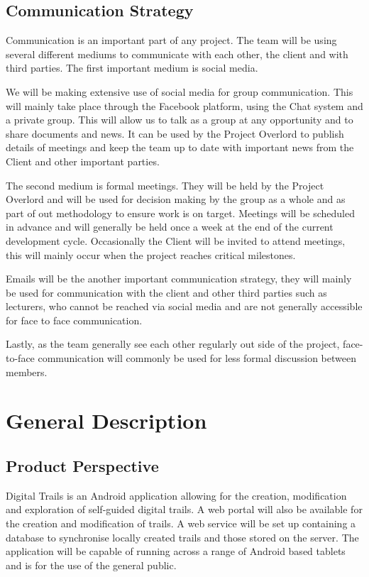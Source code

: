 \documentclass[11pt,a4paper]{article}
\begin{document}
\subsection{Communication Strategy}

Communication is an important part of any project. The team will be using several different mediums to communicate with each other, the client and with third parties. The first important medium is social media. 

We will be making extensive use of social media for group communication. This will mainly take place through the Facebook platform, using the Chat system and a private group. This will allow us to talk as a group at any opportunity and to share documents and news. It can be used by the Project Overlord to publish details of meetings and keep the team up to date with important news from the Client and other important parties. 

The second medium is formal meetings. They will be held by the Project Overlord and will be used for decision making by the group as a whole and as part of out methodology to ensure work is on target. Meetings will be scheduled in advance and will generally be held once a week at the end of the current development cycle. Occasionally the Client will be invited to attend meetings, this will mainly occur when the project reaches critical milestones. 

Emails will be the another important communication strategy, they will mainly be used for communication with the client and other third parties such as lecturers, who cannot be reached via social media and are not generally accessible for face to face communication. 

Lastly, as the team generally see each other regularly out side of the project, face-to-face communication will commonly be used for less formal discussion between members. 

\section{General Description}
\label{sec:gen-desc}

\subsection{Product Perspective}
\label{sec:product-perspective}
Digital Trails is an Android application  allowing for the creation, modification and exploration of self-guided digital trails. A web portal will also be available for the creation and modification of trails. A web service will be set up containing a database to synchronise locally created trails and those stored on the server. The application will be capable of running across a range of Android based tablets and is for the use of the general public.
\end{document}
